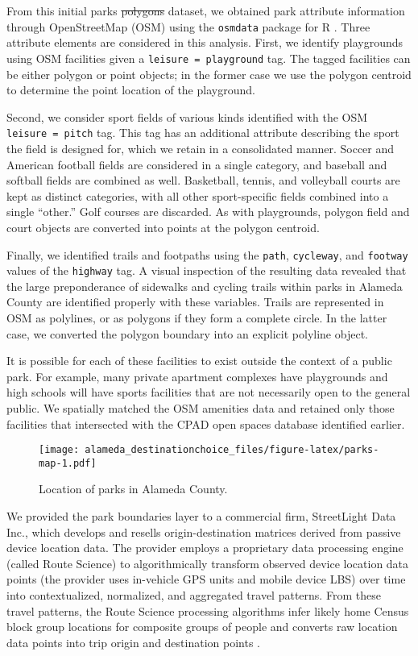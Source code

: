 \documentclass[3p, authoryear, review, doubleblind]{elsarticle} %
\providecommand{\DIFaddtex}[1]{{\protect\color{blue}\uwave{#1}}} %
\providecommand{\DIFdeltex}[1]{{\protect\color{red}\sout{#1}}}                      %
\providecommand{\DIFaddbegin}{} %
\providecommand{\DIFaddend}{} %
\providecommand{\DIFdelbegin}{} %
\providecommand{\DIFdelend}{} %
\providecommand{\DIFadd}[1]{\texorpdfstring{\DIFaddtex{#1}}{#1}} %
\providecommand{\DIFdel}[1]{\texorpdfstring{\DIFdeltex{#1}}{}} %
\newcommand{\DIFscaledelfig}{0.5}
\newlength{\DIFdelgraphicswidth} %
\newlength{\DIFdelgraphicsheight} %
\newcommand{\DIFaddincludegraphics}[2][]{{\color{blue}\fbox{\DIFOincludegraphics[#1]{#2}}}} %
\newcommand{\DIFdelincludegraphics}[2][]{%
\sbox{\DIFdelgraphicsbox}{\DIFOincludegraphics[#1]{#2}}%
\settoboxwidth{\DIFdelgraphicswidth}{\DIFdelgraphicsbox} %
\settoboxtotalheight{\DIFdelgraphicsheight}{\DIFdelgraphicsbox} %
\scalebox{\DIFscaledelfig}{%
\parbox[b]{\DIFdelgraphicswidth}{\usebox{\DIFdelgraphicsbox}\\[-\baselineskip] \rule{\DIFdelgraphicswidth}{0em}}\llap{\resizebox{\DIFdelgraphicswidth}{\DIFdelgraphicsheight}{%
\setlength{\unitlength}{\DIFdelgraphicswidth}%
\begin{picture}(1,1)%
\thicklines\linethickness{2pt} %
{\color[rgb]{1,0,0}\put(0,0){\framebox(1,1){}}}%
{\color[rgb]{1,0,0}\put(0,0){\line( 1,1){1}}}%
{\color[rgb]{1,0,0}\put(0,1){\line(1,-1){1}}}%
\end{picture}%
}\hspace*{3pt}}} %
} %
\DeclareRobustCommand{\DIFaddbegin}{\DIFOaddbegin \let\includegraphics\DIFaddincludegraphics} %
\DeclareRobustCommand{\DIFaddend}{\DIFOaddend \let\includegraphics\DIFOincludegraphics} %
\DeclareRobustCommand{\DIFdelbegin}{\DIFOdelbegin \let\includegraphics\DIFdelincludegraphics} %
\DeclareRobustCommand{\DIFdelend}{\DIFOaddend \let\includegraphics\DIFOincludegraphics} %
\begin{document}
From this initial parks \DIFdelbegin \DIFdel{polygons }\DIFdelend \DIFaddbegin \DIFadd{polygon }\DIFaddend dataset, we obtained park attribute information
through OpenStreetMap (OSM) using the \texttt{osmdata} package for R \citep{osmdata}. Three
attribute elements are considered in this analysis. First, we identify
playgrounds using OSM facilities given a \texttt{leisure\ =\ playground} tag. The tagged
facilities can be either polygon or point objects; in the former case we use the
polygon centroid to determine the point location of the playground.

Second, we consider sport fields of various kinds identified with the OSM
\texttt{leisure\ =\ pitch} tag. This tag has an additional attribute describing the sport
the field is designed for, which we retain in a consolidated manner. Soccer and
American football fields are considered in a single category, and baseball and
softball fields are combined as well. Basketball, tennis, and volleyball courts
are kept as distinct categories, with all other sport-specific fields combined
into a single ``other.'' Golf courses are discarded. As with playgrounds, polygon
field and court objects are converted into points at the polygon centroid.

Finally, we identified trails and footpaths using the \texttt{path}, \texttt{cycleway}, and
\texttt{footway} values of the \texttt{highway} tag. A visual inspection of the resulting data
revealed that the large preponderance of sidewalks and cycling trails within
parks in Alameda County are identified properly with these variables. Trails are
represented in OSM as polylines, or as polygons if they form a complete circle.
In the latter case, we converted the polygon boundary into an explicit polyline
object.

It is possible for each of these facilities to exist outside the context of a
public park. For example, many private apartment complexes have playgrounds and
high schools will have sports facilities that are not necessarily open to the
general public. We spatially matched the OSM amenities data and retained only
those facilities that intersected with the CPAD open spaces database identified
earlier.

\begin{figure}
\centering
\texttt{[image: alameda\_destinationchoice\_files/figure-latex/parks-map-1.pdf]}
\caption{\label{fig:parks-map}Location of parks in Alameda County.}
\end{figure}

We provided the park boundaries layer to a commercial firm, StreetLight Data
Inc., which develops and resells origin-destination matrices derived from
passive device location data. The provider employs a proprietary data processing
engine (called Route Science) to algorithmically transform observed device
location data points (the provider uses in-vehicle GPS units and mobile device
LBS) over time into contextualized, normalized, and aggregated travel patterns.
From these travel patterns, the Route Science processing algorithms infer likely
home Census block group locations for composite groups of people and converts
raw location data points into trip origin and destination points \citep{Pan2006, Friedrich2010}.
\end{document}
